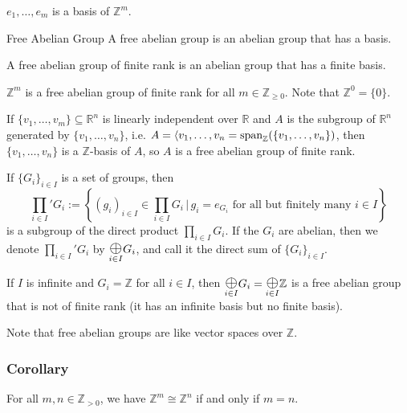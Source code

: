 \documentclass{article}
\begin{document}
\begin{example}
    $e_1,\dots,e_m$ is a basis of $\mathbb{Z}^m$.
\end{example}
\begin{definition}{Free Abelian Group}
    A free abelian group is an abelian group that has a basis.
    \vspace{2mm}

    A free abelian group of finite rank is an abelian group that has a finite basis.
\end{definition}
\begin{example}
    $\mathbb{Z}^m$ is a free abelian group of finite rank for all $m\in \mathbb{Z}_{\ge 0}$. Note that $\mathbb{Z}^0=\{0\}$.
\end{example}
\begin{example}
    If $\{v_1,\dots,v_m\} \subseteq \mathbb{R}^n$ is linearly independent over $\mathbb{R}$ and $A$ is the subgroup of $\mathbb{R}^n$ generated by $\{v_1,\dots,v_n\}$, i.e. $A=\langle v_1,\dots,v_n=\mathrm{span}_{\mathbb{Z}}(\{v_1,\dots,v_n\})$, then $\{v_1,\dots,v_n\}$ is a $\mathbb{Z}$-basis of $A$, so $A$ is a free abelian group of finite rank.
\end{example}
\begin{example}
    If $\{G_i\}_{i\in I}$ is a set of groups, then
    $$\prod_{i\in I}' G_i := \left\{(g_i)_{i\in I} \in \prod_{i\in I}G_i\,\bigg\vert\,g_i = e_{G_i} \text{ for all but finitely many } i \in I\right\}$$
    is a subgroup of the direct product $\prod_{i\in I} G_i$. If the $G_i$ are abelian, then we denote $\prod_{i\in I}' G_i$ by $\Oplus{i\in I} G_i$, and call it the direct sum of $\{G_i\}_{i \in I}$.

    If $I$ is infinite and $G_i=\mathbb{Z}$ for all $i\in I$, then $\Oplus{i\in I}G_i = \Oplus{i\in I}\mathbb{Z}$ is a free abelian group that is not of finite rank (it has an infinite basis but no finite basis).
\end{example}
Note that free abelian groups are like vector spaces over $\mathbb{Z}$.
\subsubsection{Corollary}
\begin{idea}
    For all $m,n \in \mathbb{Z}_{>0}$, we have $\mathbb{Z}^m \cong \mathbb{Z}^n$ if and only if $m=n$.
\end{idea}
\end{document}
